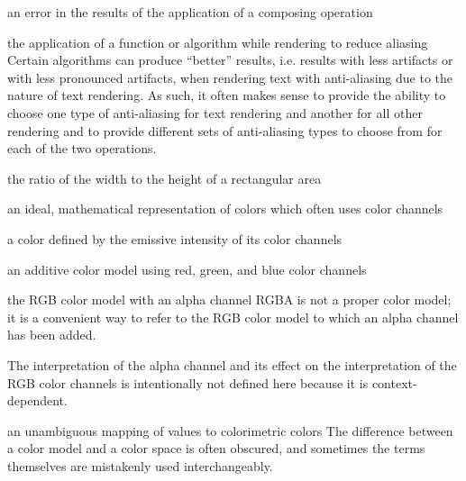 an error in the results of the application of a composing operation 

the application of a function or algorithm while rendering to 
reduce aliasing
\enternote
Certain algorithms can produce ``better'' results, i.e. results with less 
artifacts or with less pronounced artifacts, when rendering text with 
anti-aliasing due to the nature of text rendering. As such, it often makes 
sense to provide the ability to choose one type of anti-aliasing for text 
rendering and another for all other rendering and to provide different sets of 
anti-aliasing types to choose from for each of the two operations.
\exitnote

the ratio of the width to the height of a rectangular area

an ideal, mathematical representation of colors which often uses color channels

a color defined by the emissive intensity of its color channels

an additive color model using red, green, and blue color channels

the RGB color model with an alpha channel
\enternote
RGBA is not a proper color model; it is a convenient way to refer to the RGB color model to which an alpha channel has been added.

The interpretation of the alpha channel and its effect on the interpretation of the RGB color channels is intentionally not defined here because it is context-dependent.
\exitnote

an unambiguous mapping of values to colorimetric colors
\enternote
The difference between a color model and a color space is often obscured, and sometimes the terms themselves are mistakenly used interchangeably.

